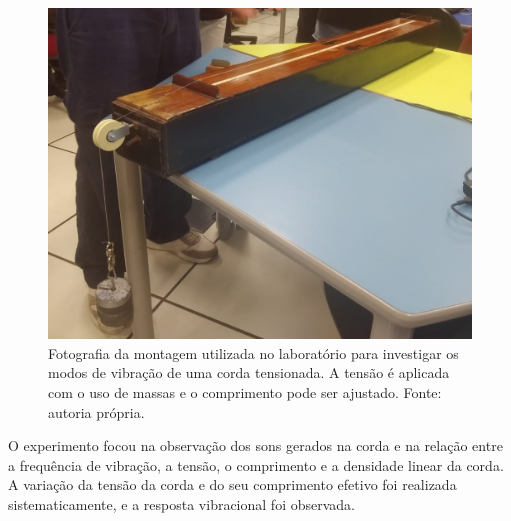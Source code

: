 \begin{figure}[H]
    \centering
    \includegraphics[width=0.30\linewidth]{fig/umacorda.png.jpg}
    \caption{Fotografia da montagem utilizada no laboratório para investigar os modos de vibração de uma corda tensionada. A tensão é aplicada com o uso de massas e o comprimento pode ser ajustado. Fonte: autoria própria.}
    \label{fig:umacorda}
\end{figure}

O experimento focou na observação dos sons gerados na corda e na relação entre a frequência de vibração, a tensão, o comprimento e a densidade linear da corda. A variação da tensão da corda e do seu comprimento efetivo foi realizada sistematicamente, e a resposta vibracional foi observada.
